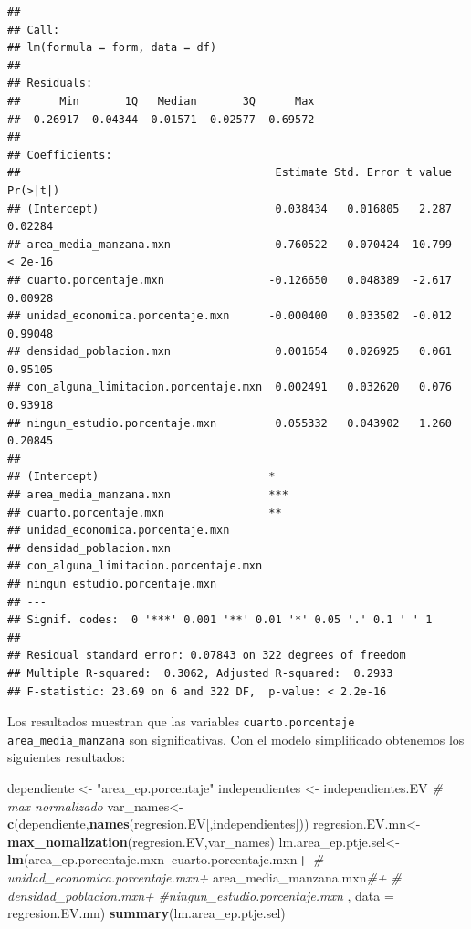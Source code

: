 \documentclass[12pt,]{book}
\newenvironment{Shaded}{\begin{snugshade}}{\end{snugshade}}
\newcommand{\KeywordTok}[1]{\textcolor[rgb]{0.13,0.29,0.53}{\textbf{#1}}}
\newcommand{\DataTypeTok}[1]{\textcolor[rgb]{0.13,0.29,0.53}{#1}}
\newcommand{\StringTok}[1]{\textcolor[rgb]{0.31,0.60,0.02}{#1}}
\newcommand{\CommentTok}[1]{\textcolor[rgb]{0.56,0.35,0.01}{\textit{#1}}}
\newcommand{\OperatorTok}[1]{\textcolor[rgb]{0.81,0.36,0.00}{\textbf{#1}}}
\newcommand{\NormalTok}[1]{#1}
\begin{document}
\begin{verbatim}
## 
## Call:
## lm(formula = form, data = df)
## 
## Residuals:
##      Min       1Q   Median       3Q      Max 
## -0.26917 -0.04344 -0.01571  0.02577  0.69572 
## 
## Coefficients:
##                                       Estimate Std. Error t value Pr(>|t|)
## (Intercept)                           0.038434   0.016805   2.287  0.02284
## area_media_manzana.mxn                0.760522   0.070424  10.799  < 2e-16
## cuarto.porcentaje.mxn                -0.126650   0.048389  -2.617  0.00928
## unidad_economica.porcentaje.mxn      -0.000400   0.033502  -0.012  0.99048
## densidad_poblacion.mxn                0.001654   0.026925   0.061  0.95105
## con_alguna_limitacion.porcentaje.mxn  0.002491   0.032620   0.076  0.93918
## ningun_estudio.porcentaje.mxn         0.055332   0.043902   1.260  0.20845
##                                         
## (Intercept)                          *  
## area_media_manzana.mxn               ***
## cuarto.porcentaje.mxn                ** 
## unidad_economica.porcentaje.mxn         
## densidad_poblacion.mxn                  
## con_alguna_limitacion.porcentaje.mxn    
## ningun_estudio.porcentaje.mxn           
## ---
## Signif. codes:  0 '***' 0.001 '**' 0.01 '*' 0.05 '.' 0.1 ' ' 1
## 
## Residual standard error: 0.07843 on 322 degrees of freedom
## Multiple R-squared:  0.3062, Adjusted R-squared:  0.2933 
## F-statistic: 23.69 on 6 and 322 DF,  p-value: < 2.2e-16
\end{verbatim}

Los resultados muestran que las variables \texttt{cuarto.porcentaje}
\texttt{area\_media\_manzana} son significativas. Con el modelo
simplificado obtenemos los siguientes resultados:

\begin{Shaded}
\begin{Highlighting}[]
\NormalTok{dependiente <-}\StringTok{ "area_ep.porcentaje"}
\NormalTok{independientes  <-}\StringTok{ }\NormalTok{independientes.EV}
\CommentTok{# max normalizado }
\NormalTok{var_names<-}\KeywordTok{c}\NormalTok{(dependiente,}\KeywordTok{names}\NormalTok{(regresion.EV[,independientes]))}
\NormalTok{regresion.EV.mn<-}\KeywordTok{max_nomalization}\NormalTok{(regresion.EV,var_names)}
\NormalTok{lm.area_ep.ptje.sel<-}\KeywordTok{lm}\NormalTok{(area_ep.porcentaje.mxn}\OperatorTok{~}\NormalTok{cuarto.porcentaje.mxn}\OperatorTok{+}
\StringTok{                      }\CommentTok{# unidad_economica.porcentaje.mxn+}
\StringTok{                      }\NormalTok{area_media_manzana.mxn}\CommentTok{#+}
                      \CommentTok{# densidad_poblacion.mxn+}
                      \CommentTok{#ningun_estudio.porcentaje.mxn}
\NormalTok{                      ,}
                    \DataTypeTok{data =}\NormalTok{ regresion.EV.mn)}
\KeywordTok{summary}\NormalTok{(lm.area_ep.ptje.sel)}
\end{Highlighting}
\end{Shaded}
\end{document}
